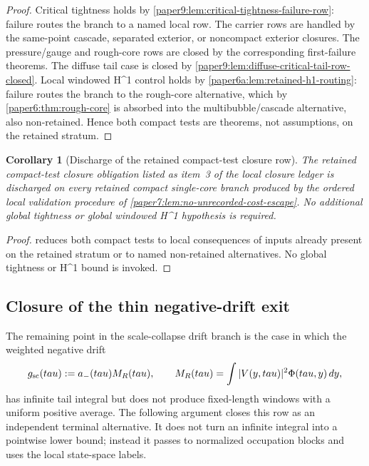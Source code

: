 \documentclass[11pt]{amsart}
\def\({}%
\def\){}%
\def\tau{tau}%
\theoremstyle{plain}
\newtheorem{corollary}[corollary]{Corollary}
\theoremstyle{definition}
\theoremstyle{remark}
\begin{document}
\begin{proof}
Critical tightness holds by
\cref{paper9:lem:critical-tightness-failure-row}: failure routes the branch
to a named local row.  The carrier rows are handled by the same-point cascade,
separated exterior, or noncompact exterior closures.  The pressure/gauge and
rough-core rows are closed by the corresponding first-failure theorems.  The
diffuse tail case is closed by
\cref{paper9:lem:diffuse-critical-tail-row-closed}.  Local
windowed \(H^1\) control holds by
\cref{paper6a:lem:retained-h1-routing}: failure routes the branch to the
rough-core alternative, which by \cref{paper6:thm:rough-core} is
absorbed into the multibubble/cascade alternative, also non-retained.
Hence both compact tests are theorems, not assumptions, on the retained
stratum.
\end{proof}

\begin{corollary}[Discharge of the retained compact-test closure row]
\label{paper6a:cor:compact-test-closure-discharged}
The retained compact-test closure obligation listed as item~3 of the
local closure ledger is discharged on every retained compact single-core branch
produced by the ordered local validation procedure of
\cref{paper7:lem:no-unrecorded-cost-escape}.  No additional global
tightness or global windowed \(H^1\) hypothesis is required.
\end{corollary}

\begin{proof}
 reduces both compact
tests to local consequences of inputs already present on the retained
stratum or to named non-retained alternatives.  No global tightness or
\(H^1\) bound is invoked.
\end{proof}

\subsection{Closure of the thin negative-drift exit}
\label{paper6a:subsec:thin-negative-drift-closure}

The remaining point in the scale-collapse drift branch is the case in which
the weighted negative drift
\[
  g_{\rm sc}(\tau):=a_-(\tau)M_R(\tau),
  \qquad
  M_R(\tau)=\int |V(y,\tau)|^2\Phi(\tau,y)\,dy,
\]
has infinite tail integral but does not produce fixed-length windows with a
uniform positive average.  The following argument closes this row as an
independent terminal alternative.  It does not turn an infinite integral into a
pointwise lower bound; instead it passes to normalized occupation blocks and
uses the local state-space labels.
\end{document}

